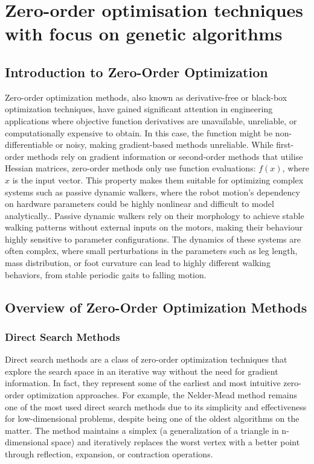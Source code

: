\chapter{Zero-order optimisation techniques with focus on genetic algorithms}
\section{Introduction to Zero-Order Optimization}

Zero-order optimization methods, also known as derivative-free or black-box optimization techniques, have gained significant attention in engineering applications where objective function derivatives are unavailable, unreliable, or computationally expensive to obtain\cite{Audet2017}. 
In this case, the function might be non-differentiable or noisy, making gradient-based methods unreliable. While first-order methods rely on gradient information or second-order methods that utilise Hessian matrices, zero-order methods only use function evaluations: $f(x)$, where $x$ is the input vector. 
This property makes them suitable for optimizing complex systems such as passive dynamic walkers, where the robot motion's dependency on hardware parameters could be highly nonlinear and difficult to model analytically.\cite{T.McGeer:1990c}\cite{Collins2005}.
Passive dynamic walkers rely on their morphology to achieve stable walking patterns without external inputs on the motors, making their behaviour highly sensitive to parameter configurations\cite{Kuo1999}\cite{Garcia1998}. 
The dynamics of these systems are often complex, where small perturbations in the parameters such as leg length, mass distribution, or foot curvature can lead to highly different walking behaviors, from stable periodic gaits to falling motion\cite{Goswami1998}.

\section{Overview of Zero-Order Optimization Methods}
\subsection{Direct Search Methods}
Direct search methods are a class of zero-order optimization techniques that explore the search space in an iterative way without the need for gradient information. In fact, they represent some of the earliest and most intuitive zero-order optimization approaches. 
For example, the Nelder-Mead method\cite{Nelder1965} remains one of the most used direct search methods due to its simplicity and effectiveness for low-dimensional problems, despite being one of the oldest algorithms on the matter. 
The method maintains a simplex (a generalization of a triangle in n-dimensional space) and iteratively replaces the worst vertex with a better point through reflection, expansion, or contraction operations.

